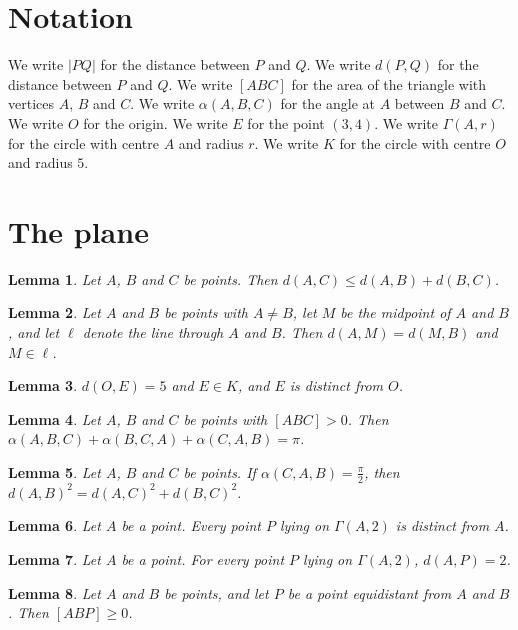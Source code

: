 \documentclass{article}
\newtheorem{lemma}{Lemma}
\begin{document}
\section{Notation}

We write $|PQ|$ for the distance between $P$ and $Q$.
We write $d(P,Q)$ for the distance between $P$ and $Q$.
We write $[ABC]$ for the area of the triangle with vertices $A$, $B$ and $C$.
We write $\alpha(A,B,C)$ for the angle at $A$ between $B$ and $C$.
We write $O$ for the origin.
We write $E$ for the point $(3,4)$.
We write $\Gamma(A,r)$ for the circle with centre $A$ and radius $r$.
We write $K$ for the circle with centre $O$ and radius $5$.

\section{The plane}

\begin{lemma}\label{triangle}
Let $A$, $B$ and $C$ be points. Then $d(A,C)\le d(A,B)+d(B,C)$.
\end{lemma}

\begin{lemma}\label{midpoint}
Let $A$ and $B$ be points with $A\ne B$, let $M$ be the midpoint of $A$ and $B$, and let $\ell$ denote the line through $A$ and $B$. Then $d(A,M)=d(M,B)$ and $M\in\ell$.
\end{lemma}

\begin{lemma}\label{coordinates}
$d(O,E)=5$ and $E\in K$, and $E$ is distinct from $O$.
\end{lemma}

\begin{lemma}\label{angles}
Let $A$, $B$ and $C$ be points with $[ABC]>0$. Then $\alpha(A,B,C)+\alpha(B,C,A)+\alpha(C,A,B)=\pi$.
\end{lemma}

\begin{lemma}\label{pythagoras}
Let $A$, $B$ and $C$ be points. If $\alpha(C,A,B)=\frac{\pi}{2}$, then $d(A,B)^2=d(A,C)^2+d(B,C)^2$.
\end{lemma}

\begin{lemma}\label{circle}
Let $A$ be a point. Every point $P$ lying on $\Gamma(A,2)$ is distinct from $A$.
\end{lemma}

\begin{lemma}\label{radius}
Let $A$ be a point. For every point $P$ lying on $\Gamma(A,2)$, $d(A,P)=2$.
\end{lemma}

\begin{lemma}\label{bisector}
Let $A$ and $B$ be points, and let $P$ be a point equidistant from $A$ and $B$. Then $[ABP]\ge0$.
\end{lemma}
\end{document}
